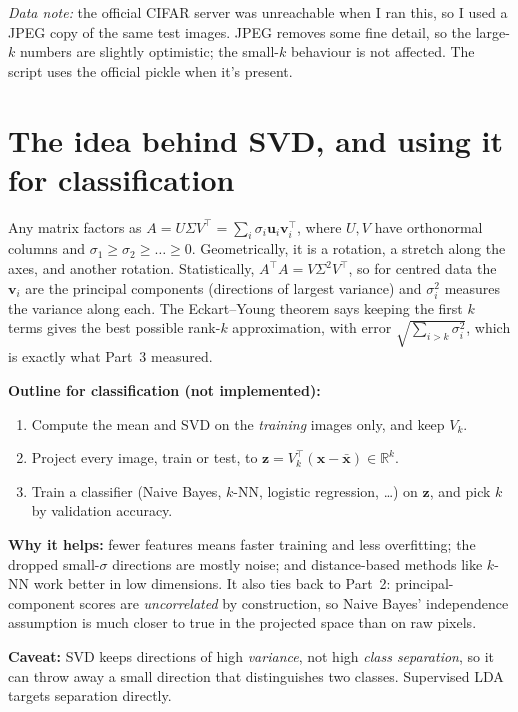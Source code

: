 \documentclass[11pt]{article}
\begin{document}
\emph{Data note:} the official CIFAR server was unreachable when I ran this, so I used a JPEG copy of the same test images. JPEG removes some fine detail, so the large-$k$ numbers are slightly optimistic; the small-$k$ behaviour is not affected. The script uses the official pickle when it's present.

\section{The idea behind SVD, and using it for classification}

Any matrix factors as $A=U\Sigma V^\top=\sum_i \sigma_i\mathbf{u}_i\mathbf{v}_i^\top$, where $U,V$ have orthonormal columns and $\sigma_1\ge\sigma_2\ge\dots\ge0$. Geometrically, it is a rotation, a stretch along the axes, and another rotation. Statistically, $A^\top A=V\Sigma^2V^\top$, so for centred data the $\mathbf{v}_i$ are the principal components (directions of largest variance) and $\sigma_i^2$ measures the variance along each. The Eckart--Young theorem says keeping the first $k$ terms gives the best possible rank-$k$ approximation, with error $\sqrt{\sum_{i>k}\sigma_i^2}$, which is exactly what Part~3 measured.

\textbf{Outline for classification (not implemented):}
\begin{enumerate}
  \item Compute the mean and SVD on the \emph{training} images only, and keep $V_k$.
  \item Project every image, train or test, to $\mathbf{z}=V_k^\top(\mathbf{x}-\bar{\mathbf{x}})\in\mathbb{R}^k$.
  \item Train a classifier (Naive Bayes, $k$-NN, logistic regression, \dots) on $\mathbf{z}$, and pick $k$ by validation accuracy.
\end{enumerate}

\textbf{Why it helps:} fewer features means faster training and less overfitting; the dropped small-$\sigma$ directions are mostly noise; and distance-based methods like $k$-NN work better in low dimensions. It also ties back to Part~2: principal-component scores are \emph{uncorrelated} by construction, so Naive Bayes' independence assumption is much closer to true in the projected space than on raw pixels.

\textbf{Caveat:} SVD keeps directions of high \emph{variance}, not high \emph{class separation}, so it can throw away a small direction that distinguishes two classes. Supervised LDA targets separation directly.
\end{document}
